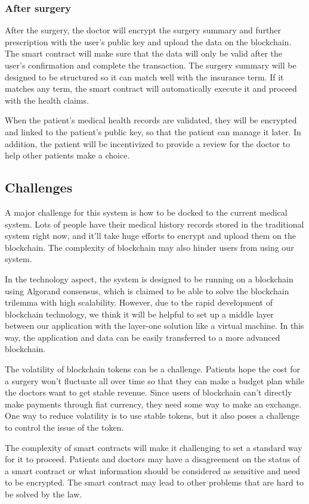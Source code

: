 \documentclass{article}
\begin{document}
\subsubsection{After surgery}
After the surgery, the doctor will encrypt the surgery summary and further prescription with the user's public key and upload the data on the blockchain. The smart contract will make sure that the data will only be valid after the user's confirmation and complete the transaction. The surgery summary will be designed to be structured so it can match well with the insurance term. If it matches any term, the smart contract will automatically execute it and proceed with the health claims.
\par When the patient's medical health records are validated, they will be encrypted and linked to the patient's public key, so that the patient can manage it later. In addition, the patient will be incentivized to provide a review for the doctor to help other patients make a choice.
\subsection{Challenges}
A major challenge for this system is how to be docked to the current medical system. Lots of people have their medical history records stored in the traditional system right now, and it'll take huge efforts to encrypt and upload them on the blockchain. The complexity of blockchain may also hinder users from using our system.
\par In the technology aspect, the system is designed to be running on a blockchain using Algorand consensus, which is claimed to be able to solve the blockchain trilemma with high scalability\cite{algorand}. However, due to the rapid development of blockchain technology, we think it will be helpful to set up a middle layer between our application with the layer-one solution like a virtual machine. In this way, the application and data can be easily transferred to a more advanced blockchain.
\par The volatility of blockchain tokens can be a challenge. Patients hope the cost for a surgery won't fluctuate all over time so that they can make a budget plan while the doctors want to get stable revenue. Since users of blockchain can't directly make payments through fiat currency, they need some way to make an exchange. One way to reduce volatility is to use stable tokens, but it also poses a challenge to control the issue of the token.
\par The complexity of smart contracts will make it challenging to set a standard way for it to proceed. Patients and doctors may have a disagreement on the status of a smart contract or what information should be considered as sensitive and need to be encrypted. The smart contract may lead to other problems that are hard to be solved by the law.
\end{document}
